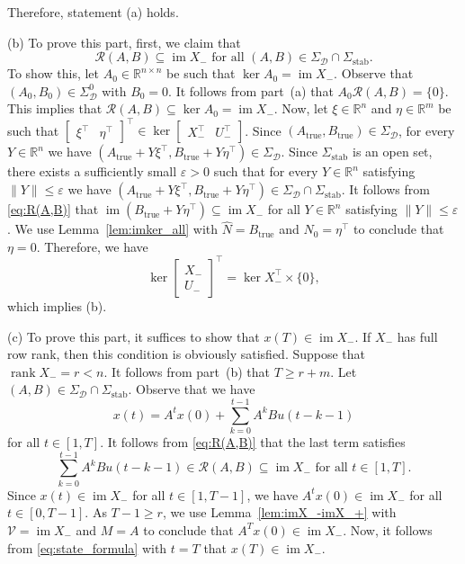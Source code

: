 \documentclass[9pt,shortpaper,twoside,web]{ieeecolor}
\DeclareMathOperator{\rank}{rank}
\DeclareMathOperator{\im}{im}
\begin{document}
Therefore, statement (a) holds.

(b) To prove this part, first, we claim that 
\begin{equation}
\label{eq:R(A,B)}
\mathcal{R}(A,B)\subseteq\im X_-\text{ for all } (A,B)\in\Sigma_\mathcal{D}\cap\Sigma_\text{stab}.
\end{equation}
To show this, let $A_0 \in \mathbb{R}^{n \times n}$ be such that \mbox{$\ker A_0 = \im X_-$}. Observe that $(A_0,B_0)\in\Sigma^0_\mathcal{D}$ with \mbox{$B_0=0$}. It follows from part~(a) that \mbox{$A_0\mathcal{R}(A,B)=\{0\}$}. This implies that \mbox{$\mathcal{R}(A,B)\subseteq \ker A_0=\im X_-$}. Now, let $\xi\in\mathbb{R}^{n}$ and $\eta\in\mathbb{R}^{m}$ be such that \mbox{$\begin{bmatrix}
\xi^\top & \eta^\top
\end{bmatrix}^\top\in\ker\begin{bmatrix}
X_-^\top & U_-^\top
\end{bmatrix}$}. Since $(A_\text{true},B_\text{true})\in\Sigma_\mathcal{D}$, for every $Y\in\mathbb{R}^{n}$  we have \mbox{$(A_\text{true}+Y\xi^\top,B_\text{true}+Y\eta^\top)\in\Sigma_\mathcal{D}$}. Since $\Sigma_\text{stab}$ is an open set, there exists a sufficiently small $\varepsilon>0$ such that for every $Y\in\mathbb{R}^{n}$ satisfying $\|Y\|\leq\varepsilon$ we have \mbox{$(A_\text{true}+Y\xi^\top,B_\text{true}+Y\eta^\top)\in\Sigma_\mathcal{D}\cap\Sigma_\text{stab}$}. It follows from \eqref{eq:R(A,B)} that $\im (B_\text{true}+Y\eta^\top)\subseteq\im X_-$ for all $Y\in\mathbb{R}^{n}$ satisfying $\|Y\|\leq\varepsilon$. We use Lemma~\ref{lem:imker_all} with $\hat{N}=B_\text{true}$ and $N_0=\eta^\top$ to conclude that $\eta=0$. Therefore, we have
\begin{equation}
\label{eq:kerX_U_}
\ker\begin{bmatrix}
X_- \\ U_-
\end{bmatrix}^\top=\ker X_-^\top \times \{0\},
\end{equation}
which implies (b). 

(c) To prove this part, it suffices to show that $x(T)\in\im X_-$. If $X_-$ has full row rank, then this condition is obviously satisfied. Suppose that $\rank X_-=r<n$. It follows from part~(b) that \mbox{$T\geq r+m$}. Let $(A,B)\in\Sigma_\mathcal{D}\cap\Sigma_\text{stab}$. Observe that we have
\begin{equation}
\label{eq:state_formula}
x(t)=A^tx(0)+\sum_{k=0}^{t-1} A^kBu(t-k-1)
\end{equation}
for all $t\in[1,T]$. It follows from \eqref{eq:R(A,B)} that the last term satisfies
\begin{equation}
\sum_{k=0}^{t-1} A^kBu(t-k-1)\in\mathcal{R}(A,B)\subseteq \im X_- \text{ for all } t\in[1,T].
\end{equation}
Since $x(t)\in\im X_-$ for all $t\in[1,T-1]$, we have $A^t x(0)\in \im X_-$ for all $t\in[0,T-1]$. As $T-1\geq r$, we use Lemma~\ref{lem:imX_-imX_+} with $\mathcal{V}=\im X_-$ and $M=A$ to conclude that $A^T x(0)\in \im X_-$. Now, it follows from \eqref{eq:state_formula} with $t=T$ that $x(T)\in\im X_-$. 
\end{document}

